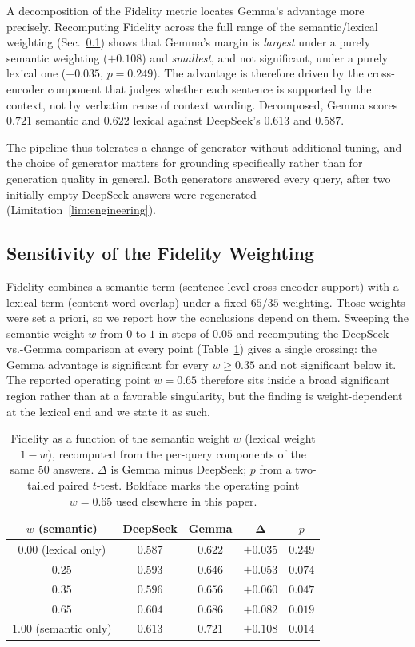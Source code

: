 \documentclass[runningheads]{llncs}
\begin{document}
A decomposition of the Fidelity metric locates Gemma's advantage more precisely. Recomputing Fidelity across the full range of the semantic/lexical weighting (Sec.~\ref{sec:fidelity_weight}) shows that Gemma's margin is \emph{largest} under a purely semantic weighting ($+0.108$) and \emph{smallest}, and not significant, under a purely lexical one ($+0.035$, $p{=}0.249$). The advantage is therefore driven by the cross-encoder component that judges whether each sentence is supported by the context, not by verbatim reuse of context wording. Decomposed, Gemma scores $0.721$ semantic and $0.622$ lexical against DeepSeek's $0.613$ and $0.587$.

The pipeline thus tolerates a change of generator without additional tuning, and the choice of generator matters for grounding specifically rather than for generation quality in general. Both generators answered every query, after two initially empty DeepSeek answers were regenerated (Limitation~\ref{lim:engineering}).

\subsection{Sensitivity of the Fidelity Weighting}
\label{sec:fidelity_weight}

Fidelity combines a semantic term (sentence-level cross-encoder support) with a lexical
term (content-word overlap) under a fixed $65/35$ weighting. Those weights were set a
priori, so we report how the conclusions depend on them. Sweeping the semantic weight
$w$ from $0$ to $1$ in steps of $0.05$ and recomputing the DeepSeek-vs.-Gemma
comparison at every point (Table~\ref{tab:weight_sweep}) gives a single crossing: the
Gemma advantage is significant for every $w \geq 0.35$ and not significant below it.
The reported operating point $w{=}0.65$ therefore sits inside a broad significant
region rather than at a favorable singularity, but the finding is weight-dependent at
the lexical end and we state it as such.

\begin{table}[!ht]
\centering
\caption{Fidelity as a function of the semantic weight $w$ (lexical weight $1-w$),
recomputed from the per-query components of the same 50 answers. $\Delta$ is Gemma minus
DeepSeek; $p$ from a two-tailed paired $t$-test. Boldface marks the operating point
$w{=}0.65$ used elsewhere in this paper.}
\label{tab:weight_sweep}
\footnotesize
\begin{tabular}{c c c c c}
\toprule
$w$ (semantic) & \textbf{DeepSeek} & \textbf{Gemma} & $\boldsymbol{\Delta}$ & $p$ \\
\midrule
$0.00$ (lexical only) & $0.587$ & $0.622$ & $+0.035$ & $0.249$ \\
$0.25$ & $0.593$ & $0.646$ & $+0.053$ & $0.074$ \\
$0.35$ & $0.596$ & $0.656$ & $+0.060$ & $0.047$ \\
$\mathbf{0.65}$ & $0.604$ & $0.686$ & $+0.082$ & $0.019$ \\
$1.00$ (semantic only) & $0.613$ & $0.721$ & $+0.108$ & $0.014$ \\
\bottomrule
\end{tabular}
\end{table}
\end{document}
